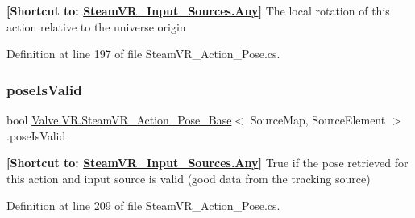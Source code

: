 {\bfseries{\mbox{[}Shortcut to\+: \mbox{\hyperlink{namespace_valve_1_1_v_r_a82e5bf501cc3aa155444ee3f0662853faed36a1ef76a59ee3f15180e0441188ad}{Steam\+V\+R\+\_\+\+Input\+\_\+\+Sources.\+Any}}\mbox{]}}} The local rotation of this action relative to the universe origin 



Definition at line 197 of file Steam\+V\+R\+\_\+\+Action\+\_\+\+Pose.\+cs.

\mbox{\label{class_valve_1_1_v_r_1_1_steam_v_r___action___pose___base_af6eb7cf17442bd20ab60aad306b49240}} 
\subsubsection{\texorpdfstring{poseIsValid}{poseIsValid}}
{\footnotesize\ttfamily bool \mbox{\hyperlink{class_valve_1_1_v_r_1_1_steam_v_r___action___pose___base}{Valve.\+V\+R.\+Steam\+V\+R\+\_\+\+Action\+\_\+\+Pose\+\_\+\+Base}}$<$ Source\+Map, Source\+Element $>$.pose\+Is\+Valid\hspace{0.3cm}{\ttfamily [get]}}



{\bfseries{\mbox{[}Shortcut to\+: \mbox{\hyperlink{namespace_valve_1_1_v_r_a82e5bf501cc3aa155444ee3f0662853faed36a1ef76a59ee3f15180e0441188ad}{Steam\+V\+R\+\_\+\+Input\+\_\+\+Sources.\+Any}}\mbox{]}}} True if the pose retrieved for this action and input source is valid (good data from the tracking source) 



Definition at line 209 of file Steam\+V\+R\+\_\+\+Action\+\_\+\+Pose.\+cs.

\mbox{\label{class_valve_1_1_v_r_1_1_steam_v_r___action___pose___base_af04d371ae8e8552385b022d1aa788d32}} 

